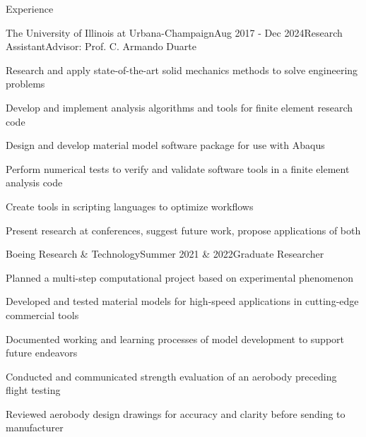 \documentclass{resume} %
\begin{document}
\begin{rSection}{Experience}

\begin{rSubsection}{The University of Illinois at Urbana-Champaign}{Aug 2017 - Dec 2024}{Research Assistant}{Advisor: Prof. C. Armando Duarte}
\item Research and apply state-of-the-art solid mechanics methods to solve engineering problems 
\item Develop and implement analysis algorithms and tools for finite element research code
\item Design and develop material model software package for use with Abaqus
\item Perform numerical tests to verify and validate software tools in a finite element analysis code
\item Create tools in scripting languages to optimize workflows
\item Present research at conferences, suggest future work, propose applications of both
\end{rSubsection}


\begin{rSubsection}{Boeing Research \& Technology}{Summer 2021  \& 2022}{Graduate Researcher}{}
%
\item Planned a multi-step computational project based on experimental phenomenon
\item Developed and tested material models for high-speed applications in cutting-edge commercial tools
\item Documented working and learning processes of model development to support future endeavors
\item Conducted and communicated strength evaluation of an aerobody preceding flight testing
\item Reviewed aerobody design drawings for accuracy and clarity before sending to manufacturer
\end{rSubsection}

\end{rSection}

\end{document}
